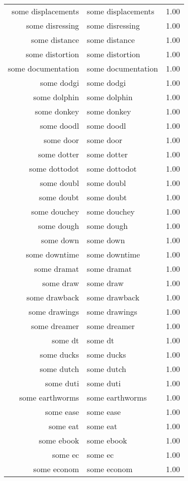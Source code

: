 \begin{table}[ht]
\begin{tabular}{rlr}
  some displacements & some displacements & 1.00 \\ 
  some disressing & some disressing & 1.00 \\ 
  some distance & some distance & 1.00 \\ 
  some distortion & some distortion & 1.00 \\ 
  some documentation & some documentation & 1.00 \\ 
  some dodgi & some dodgi & 1.00 \\ 
  some dolphin & some dolphin & 1.00 \\ 
  some donkey & some donkey & 1.00 \\ 
  some doodl & some doodl & 1.00 \\ 
  some door & some door & 1.00 \\ 
  some dotter & some dotter & 1.00 \\ 
  some dottodot & some dottodot & 1.00 \\ 
  some doubl & some doubl & 1.00 \\ 
  some doubt & some doubt & 1.00 \\ 
  some douchey & some douchey & 1.00 \\ 
  some dough & some dough & 1.00 \\ 
  some down & some down & 1.00 \\ 
  some downtime & some downtime & 1.00 \\ 
  some dramat & some dramat & 1.00 \\ 
  some draw & some draw & 1.00 \\ 
  some drawback & some drawback & 1.00 \\ 
  some drawings & some drawings & 1.00 \\ 
  some dreamer & some dreamer & 1.00 \\ 
  some dt & some dt & 1.00 \\ 
  some ducks & some ducks & 1.00 \\ 
  some dutch & some dutch & 1.00 \\ 
  some duti & some duti & 1.00 \\ 
  some earthworms & some earthworms & 1.00 \\ 
  some ease & some ease & 1.00 \\ 
  some eat & some eat & 1.00 \\ 
  some ebook & some ebook & 1.00 \\ 
  some ec & some ec & 1.00 \\ 
  some econom & some econom & 1.00 \\ 

\end{tabular}
\end{table}
